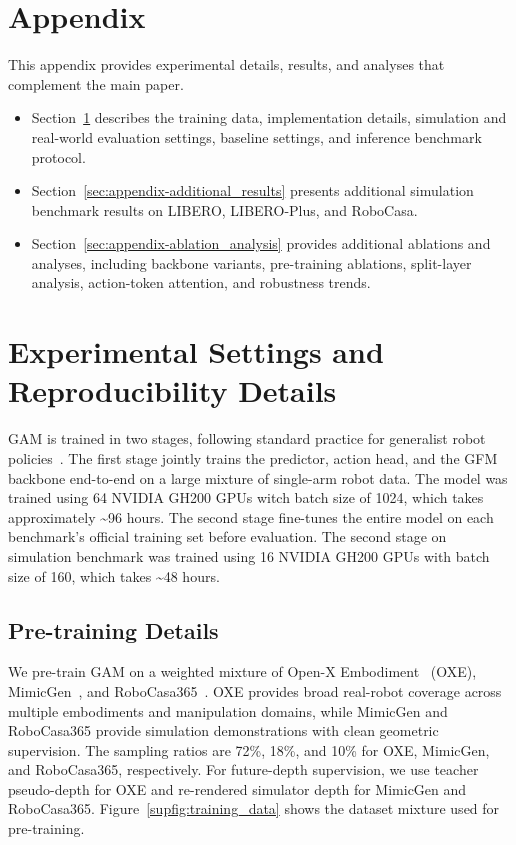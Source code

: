 \setcounter{section}{0}
\renewcommand{\thesection}{\Alph{section}}


\section*{\Large Appendix}
This appendix provides experimental details, results, and analyses that complement the main paper. 
\begin{itemize}
\item Section~\ref{sec:appendix-experimental_settings} describes the training data, implementation details, simulation and real-world evaluation settings, baseline settings, and inference benchmark protocol.
\item Section~\ref{sec:appendix-additional_results} presents additional simulation benchmark results on LIBERO, LIBERO-Plus, and RoboCasa.
\item Section~\ref{sec:appendix-ablation_analysis} provides additional ablations and analyses, including backbone variants, pre-training ablations, split-layer analysis, action-token attention, and robustness trends.
\end{itemize}

\label{secA}

\section{Experimental Settings and Reproducibility Details}
\label{sec:appendix-experimental_settings}

GAM is trained in two stages, following standard practice for generalist robot policies~\citep{openvla_oft, black2024pi_0}. The first stage jointly trains the predictor, action head, and the GFM backbone end-to-end on a large mixture of single-arm robot data. The model was trained using 64 NVIDIA GH200 GPUs witch batch size of 1024, which takes approximately \textasciitilde 96 hours. The second stage fine-tunes the entire model on each benchmark's official training set before evaluation. The second stage on simulation benchmark was trained using 16 NVIDIA GH200 GPUs with batch size of 160, which takes \textasciitilde 48 hours.
\subsection{Pre-training Details}
\label{sec:appendix-pretraining_details}
We pre-train GAM on a weighted mixture of Open-X Embodiment~\cite{collaboration2023open} (OXE), MimicGen~\cite{mandlekar2023mimicgen}, and RoboCasa365~\cite{nasiriany2026robocasa365}. OXE provides broad real-robot coverage across multiple embodiments and manipulation domains, while MimicGen and RoboCasa365 provide simulation demonstrations with clean geometric supervision. The sampling ratios are 72\%, 18\%, and 10\% for OXE, MimicGen, and RoboCasa365, respectively. For future-depth supervision, we use teacher pseudo-depth for OXE and re-rendered simulator depth for MimicGen and RoboCasa365. Figure~\ref{supfig:training_data} shows the dataset mixture used for pre-training.

